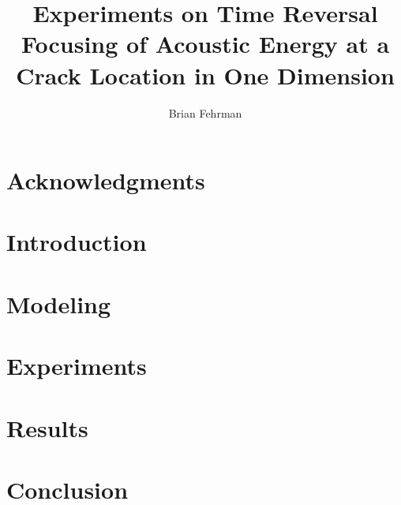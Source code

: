 \documentclass[13pt]{ucthesis}
\author{Brian Fehrman}
\title{Experiments on Time Reversal Focusing of Acoustic Energy at a Crack Location in One Dimension}
\begin{document}
\titlespacing{\chapter}{0pt}{-5pt}{-10pt}
\titlespacing{\section}{0pt}{0pt}{0pt}

\maketitle


\begin{frontmatter}
\begin{abstract}
\end{abstract}
\printglossary
\tableofcontents
\listoffigures
\end{frontmatter}

\chapter*{Acknowledgments}



\chapter{Introduction}\label{ch:Introduction}

\chapter{Modeling}\label{ch:Modeling}


\chapter{Experiments}\label{ch:Experiments}


\chapter{Results}\label{ch:Results}


%

\chapter{Conclusion}\label{ch:Conclusion}




\end{document}
